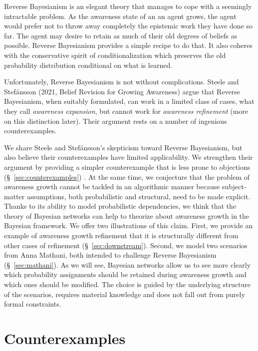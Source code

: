 \documentclass[
  11pt,
  dvipsnames,enabledeprecatedfontcommands]{scrartcl}
\begin{document}
Reverse Bayesianism is an elegant theory that manages to cope with a
seemingly intractable problem. As the awareness state of an an agent
grows, the agent would prefer not to throw away completely the epistemic
work they have done so far. The agent may desire to retain as much of
their old degrees of beliefs as possible. Reverse Bayesianism provides a
simple recipe to do that. It also coheres with the conservative spirit
of conditionalization which preserves the old probability distribution
conditional on what is learned.

Unfortunately, Reverse Bayesianism is not without complications. Steele
and Stefánsson (2021, Belief Revision for Growing Awareness) argue that
Reverse Bayesianism, when suitably formulated, can work in a limited
class of cases, what they call \textit{awareness expansion}, but cannot
work for \textit{awareness refinement} (more on this distinction later).
Their argument rests on a number of ingenious counterexamples.

We share Steele and Stefánsson's skepticism toward Reverse Bayesianism,
but also believe their counterexamples have limited applicability. We
strengthen their argument by providing a simpler counterexample that is
less prone to objections (\S ~\ref{sec:counterexamples}) . At the same
time, we conjecture that the problem of awareness growth cannot be
tackled in an algorithmic manner because subject-matter assumptions,
both probabilistic and structural, need to be made explicit. Thanks to
its ability to model probabilistic dependencies, we think that the
theory of Bayesian networks can help to theorize about awareness growth
in the Bayesian framework. We offer two illustrations of this claim.
First, we provide an example of awareness growth refinement that it is
structurally different from other cases of refinement
(\S ~\ref{sec:downstream}). Second, we model two scenarios from Anna
Mathani, both intended to challenge Reverse Bayesianism
(\S ~\ref{sec:mathani}). As we will see, Bayesian networks allow us to
see more clearly which probability assignments should be retained during
awareness growth and which ones should be modified. The choice is guided
by the underlying structure of the scenarios, requires material
knowledge and does not fall out from purely formal constraints.

\hypertarget{counterexamples}{%
\section{Counterexamples}\label{counterexamples}}
\end{document}
